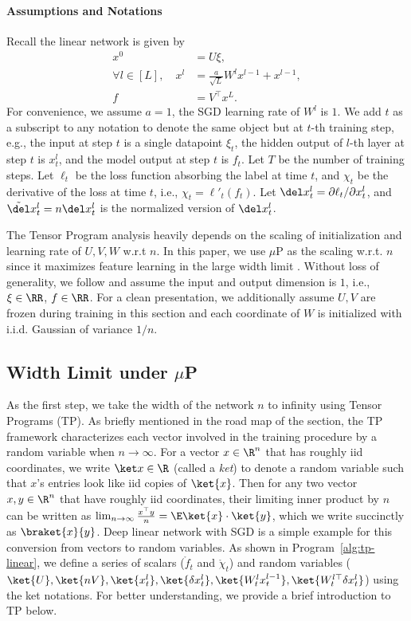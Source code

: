 \paragraph{Assumptions and Notations}
Recall the linear network is given by
\begin{align*}
    x^0 & = U \xi, \\
    \forall l\in [L], \quad x^l & = \frac a{\sqrt L} W^{l} x^{l-1} + x^{l - 1},  \\
    f &= V^\top x^L.
\end{align*}
For convenience, we assume $a=1$, the SGD learning rate of $W^l$ is $1$. We add $t$ as a subscript to any notation to denote the same object but at $t$-th training step, e.g., the input at step $t$ is a single datapoint $\xi_t$, the hidden output of $l$-th layer at step $t$ is $x_t^l$, and the model output at step $t$ is $f_t$. Let $T$ be the number of training steps. Let $\ell_t$ be the loss function absorbing the label at time $t$, and $\chi_t$ be the derivative of the loss at time $t$, i.e., $\chi_t=\ell'_t(f_t)$. Let $\del x_t^l=\partial \ell_t/\partial x_t^l$, and $\tilde\del x_t^l=n \del x_t^l$ is the normalized version of $\del x_t^l$.

The Tensor Program analysis heavily depends on the scaling of initialization and learning rate of $U, V, W$ w.r.t $n$. In this paper, we use $\mu$P as the scaling w.r.t. $n$ since it maximizes feature learning in the large width limit \citep{yang2021tensor}. 
Without loss of generality, we follow \cite{yang2021tensor} and assume the input and output dimension is $1$, i.e., $\xi\in \RR$, $f\in \RR$. For a clean presentation, we additionally assume $U, V$ are frozen during training in this section and each coordinate of $W$ is initialized with i.i.d. Gaussian of variance $1/n$.   %

\subsection{Width Limit under $\mu$P}
As the first step, we take the width of the network $n$ to infinity using Tensor Programs (TP). As briefly mentioned in the road map of the section, the TP framework characterizes each vector involved in the training procedure by a random variable when $n\to\infty$. For a vector $x\in\R^{n}$ that has roughly iid coordinates, we write $\ket x \in \R$ (called a \emph{ket}) to denote a random variable such that $x$'s entries look like iid
copies of $\ket{x}$. Then for any two vector $x, y\in \R^n$ that have roughly iid coordinates, their limiting inner product by $n$ can be written as $\lim_{n\to\infty} \frac{x^\top y} n=\E \ket{x}\cdot \ket{y}$, which we write succinctly as $\braket{x}{y}$. %
Deep linear network with SGD is a simple example for this conversion from vectors to random variables. As shown in Program~\ref{alg:tp-linear}, we define a series of scalars ($\mathring f_t$ and $\mathring \chi_t$) and random variables ($\ket{U}, \ket{nV}, \ket{x_t^l}, \ket{\delta x_t^l},\ket{W_t^l x_t^{l-1}}, \ket{W_t^{l\top} \delta x_t^l}$) using the ket notations. For better understanding, we provide a brief introduction to TP below.

